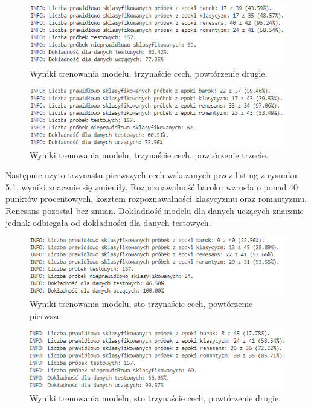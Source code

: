 \documentclass[printmode, eng, openany]{mgr}
\newcommand\tab[1][1cm]{\hspace*{#1}}
\begin{document}
\begin{figure}[H]
\centering
\includegraphics[scale=0.9]{wyniki_small_1.png}
\caption{Wyniki trenowania modelu, trzynaście cech, powtórzenie drugie.}
\end{figure}
\begin{figure}[H]
\centering
\includegraphics[scale=0.9]{wyniki_small_2.png}
\caption{Wyniki trenowania modelu, trzynaście cech, powtórzenie trzecie.}
\end{figure}
\tab Następnie użyto trzynastu pierwszych cech wskazanych przez listing z rysunku 5.1, wyniki znacznie się zmieniły. Rozpoznawalność baroku wzrosła o ponad 40 punktów procentowych, kosztem rozpoznawalności klasycyzmu oraz romantyzmu. Renesans pozostał bez zmian. Dokładność modelu dla danych uczących znacznie jednak odbiegała od dokładności dla danych testowych. 
\begin{figure}[H]
\centering
\includegraphics[scale=0.9]{wyniki_all_0.png}
\caption{Wyniki trenowania modelu, sto trzynaście cech, powtórzenie pierwsze.}
\end{figure}
\begin{figure}[H]
\centering
\includegraphics[scale=0.9]{wyniki_all_1.png}
\caption{Wyniki trenowania modelu, sto trzynaście cech, powtórzenie drugie.}
\end{figure}
\end{document}
